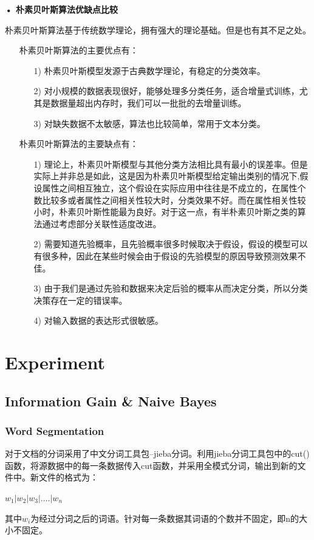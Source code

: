 \documentclass[a4paper,11pt,twoside,openany]{article}
\begin{document}
\begin{CJK*}{UTF8}{gbsn}
\textbf{• 朴素贝叶斯算法优缺点比较}

	朴素贝叶斯算法基于传统数学理论，拥有强大的理论基础。但是也有其不足之处。
\begin{enumerate}	
\item[] 朴素贝叶斯算法的主要优点有：
	\begin{enumerate}
	\item[1)] 朴素贝叶斯模型发源于古典数学理论，有稳定的分类效率。
	\item[2)] 对小规模的数据表现很好，能够处理多分类任务，适合增量式训练，尤其是数据量超出内存时，我们可以一批批的去增量训练。
	\item[3)] 对缺失数据不太敏感，算法也比较简单，常用于文本分类。
	\end{enumerate}
\item[]	朴素贝叶斯算法的主要缺点有：
	\begin{enumerate}
	\item[1)] 理论上，朴素贝叶斯模型与其他分类方法相比具有最小的误差率。但是实际上并非总是如此，这是因为朴素贝叶斯模型给定输出类别的情况下,假设属性之间相互独立，这个假设在实际应用中往往是不成立的，在属性个数比较多或者属性之间相关性较大时，分类效果不好。而在属性相关性较小时，朴素贝叶斯性能最为良好。对于这一点，有半朴素贝叶斯之类的算法通过考虑部分关联性适度改进。
	\item[2)] 需要知道先验概率，且先验概率很多时候取决于假设，假设的模型可以有很多种，因此在某些时候会由于假设的先验模型的原因导致预测效果不佳。
	\item[3)] 由于我们是通过先验和数据来决定后验的概率从而决定分类，所以分类决策存在一定的错误率。
	\item[4)] 对输入数据的表达形式很敏感。
	\end{enumerate}
\end{enumerate}

\section{Experiment}
\subsection{Information Gain \& Naive Bayes}
	
\subsubsection{Word Segmentation}
	对于文档的分词采用了中文分词工具包--jieba分词。利用jieba分词工具包中的cut()函数，将源数据中的每一条数据传入cut函数，并采用全模式分词，输出到新的文件中。新文件的格式为：
	\begin{center}
	$w_1|w_2|w_3|....|w_n$
	\end{center}
	其中$w_i$为经过分词之后的词语。针对每一条数据其词语的个数并不固定，即n的大小不固定。
	

\end{CJK*}
\end{document}
